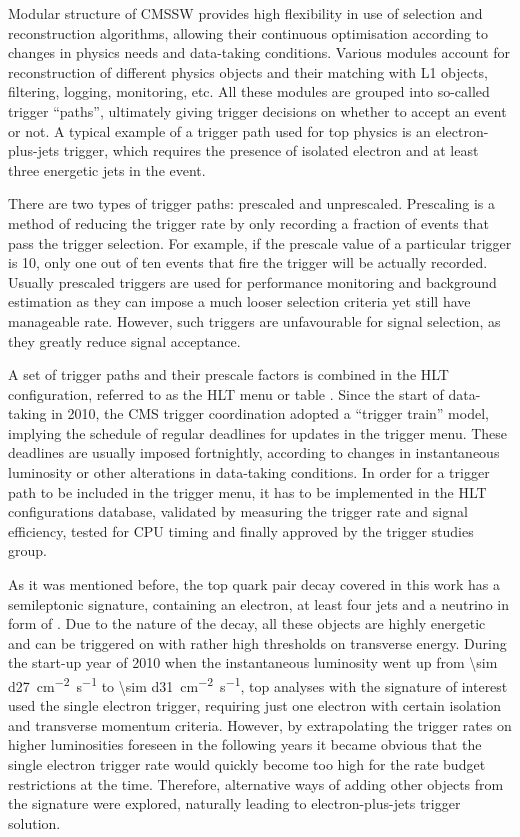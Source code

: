 Modular structure of CMSSW provides high flexibility in use of selection and reconstruction algorithms, allowing their
continuous optimisation according to changes in physics needs and data-taking conditions. Various modules account for
reconstruction of different physics objects and their matching with L1 objects, filtering, logging, monitoring, etc. All
these modules are grouped into so-called trigger ``paths'', ultimately giving trigger decisions on whether to accept an
event or not. A typical example of a trigger path used for top physics is an electron-plus-jets trigger, which requires
the presence of isolated electron and at least three energetic jets in the event.

There are two types of trigger paths: prescaled and unprescaled. Prescaling is a method of reducing the trigger rate by
only recording a fraction of events that pass the trigger selection. For example, if the prescale value of a particular
trigger is 10, only one out of ten events that fire the trigger will be actually recorded. Usually prescaled triggers
are used for performance monitoring and background estimation as they can impose a much looser selection criteria yet
still have manageable rate. However, such triggers are unfavourable for signal selection, as they greatly reduce signal
acceptance.

A set of trigger paths and their prescale factors is combined in the HLT configuration, referred to as the HLT menu or
table \cite{HLT_commissioning}. Since the start of data-taking in 2010, the CMS trigger coordination adopted a ``trigger
train'' model, implying the schedule of regular deadlines for updates in the trigger menu. These deadlines are usually
imposed fortnightly, according to changes in instantaneous luminosity or other alterations in data-taking conditions. In
order for a trigger path to be included in the trigger menu, it has to be implemented in the HLT configurations
database, validated by measuring the trigger rate and signal efficiency, tested for CPU timing and finally approved by
the trigger studies group.

As it was mentioned before, the top quark pair decay covered in this work has a semileptonic signature, containing an
electron, at least four jets and a neutrino in form of \MET. Due to the nature of the decay, all these objects are
highly energetic and can be triggered on with rather high thresholds on transverse energy. During the start-up year of
2010 when the instantaneous luminosity went up from \SI{\sim d27}{\cm^{-2} s^{-1}} to \SI{\sim d31}{\cm^{-2} s^{-1}},
top analyses with the signature of interest used the single electron trigger, requiring just one electron with certain
isolation and transverse momentum criteria. However, by extrapolating the trigger rates on higher luminosities foreseen
in the following years it became obvious that the single electron trigger rate would quickly become too high for the
rate budget restrictions at the time. Therefore, alternative ways of adding other objects from the \ttbar signature were
explored, naturally leading to electron-plus-jets trigger solution.

